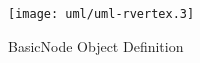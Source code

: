 \begin{figure}[htp]
  \begin{center}
    \texttt{[image: uml/uml-rvertex.3]}

    \caption{BasicNode Object Definition}
    \label{fig:node-class}
  \end{center}
\end{figure}